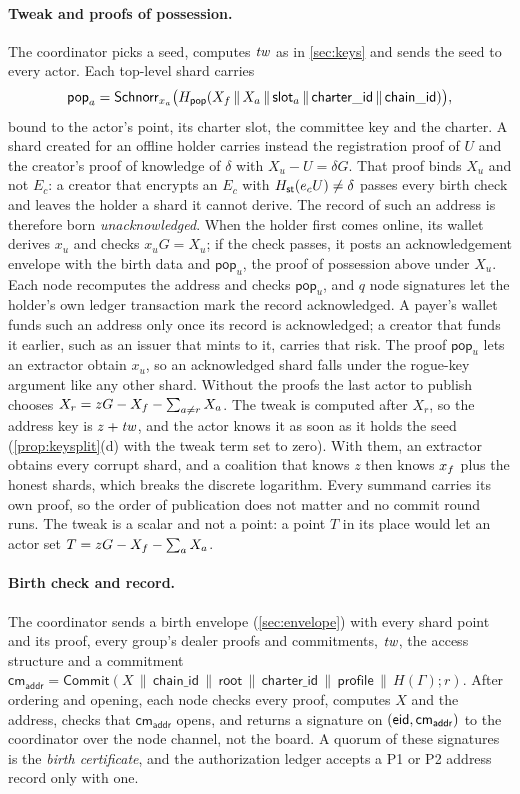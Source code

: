 \paragraph{Tweak and proofs of possession.} The coordinator picks a seed, computes $\mathit{tw}$ as in \cref{sec:keys} and sends the seed to every actor. Each top-level shard carries
\[
  \mathsf{pop}_a = \mathsf{Schnorr}_{x_a}\bigl(H_{\mathsf{pop}}(X_{f} \,\|\, X_a \,\|\, \mathsf{slot}_a \,\|\, \mathsf{charter\_id} \,\|\, \mathsf{chain\_id})\bigr),
\]
bound to the actor's point, its charter slot, the committee key and the charter. A shard created for an offline holder carries instead the registration proof of $U$ and the creator's proof of knowledge of $\delta$ with $X_u - U = \delta G$. That proof binds $X_u$ and not $E_c$: a creator that encrypts an $E_c$ with $H_{\mathsf{st}}(e_c U) \ne \delta$ passes every birth check and leaves the holder a shard it cannot derive. The record of such an address is therefore born \emph{unacknowledged}. When the holder first comes online, its wallet derives $x_u$ and checks $x_u G = X_u$; if the check passes, it posts an acknowledgement envelope with the birth data and $\mathsf{pop}_u$, the proof of possession above under $X_u$. Each node recomputes the address and checks $\mathsf{pop}_u$, and $q$ node signatures let the holder's own ledger transaction mark the record acknowledged. A payer's wallet funds such an address only once its record is acknowledged; a creator that funds it earlier, such as an issuer that mints to it, carries that risk. The proof $\mathsf{pop}_u$ lets an extractor obtain $x_u$, so an acknowledged shard falls under the rogue-key argument like any other shard. Without the proofs the last actor to publish chooses $X_r = zG - X_{f} - \sum_{a \neq r} X_a$. The tweak is computed after $X_r$, so the address key is $z + \mathit{tw}$, and the actor knows it as soon as it holds the seed (\cref{prop:keysplit}(d) with the tweak term set to zero). With them, an extractor obtains every corrupt shard, and a coalition that knows $z$ then knows $x_{f}$ plus the honest shards, which breaks the discrete logarithm. Every summand carries its own proof, so the order of publication does not matter and no commit round runs. The tweak is a scalar and not a point: a point $T$ in its place would let an actor set $T = zG - X_{f} - \sum_a X_a$.

\paragraph{Birth check and record.} The coordinator sends a birth envelope (\cref{sec:envelope}) with every shard point and its proof, every group's dealer proofs and commitments, $\mathit{tw}$, the access structure and a commitment $\mathsf{cm}_{\mathsf{addr}} = \mathsf{Commit}(X \,\|\, \mathsf{chain\_id} \,\|\, \mathsf{root} \,\|\, \mathsf{charter\_id} \,\|\, \mathsf{profile} \,\|\, H(\Gamma); r)$. After ordering and opening, each node checks every proof, computes $X$ and the address, checks that $\mathsf{cm}_{\mathsf{addr}}$ opens, and returns a signature on $(\mathsf{eid}, \mathsf{cm}_{\mathsf{addr}})$ to the coordinator over the node channel, not the board. A quorum of these signatures is the \emph{birth certificate}, and the authorization ledger accepts a P1 or P2 address record only with one.

